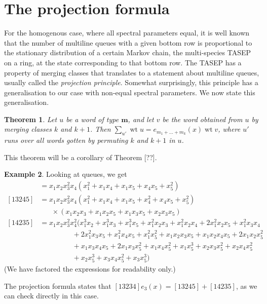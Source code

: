 \documentclass[reqno]{amsart}
\newcommand{\0}{\phantom{c}}
\DeclareMathOperator{\wt}{wt} %
\newcommand{\mm}{\mathbf{m}}
\let\sumnonlimits\sum
\renewcommand{\sum}{\sumnonlimits\limits}
\theoremstyle{plain}
\newtheorem{thm}{Theorem}[section]
\theoremstyle{definition}
\newtheorem{example}[thm]{Example}
\numberwithin{equation}{section}
\begin{document}
\section{The projection formula}

For the homogenous case, where all spectral parameters equal, it is well known that the number of multiline queues with a given bottom row is proportional to the stationary distribution of a certain Markov chain, the multi-species TASEP on a ring, at the state corresponding to that bottom row. The TASEP has a property of merging classes that translates to a statement about multiline queues, usually called the {\it projection principle}. Somewhat surprisingly, this principle has a generalisation to our case with non-equal spectral parameters. We now state this generalisation.

\begin{thm}
  Let $u$ be a word of type $\mm$, and let $v$ be the word obtained from $u$ by merging classes $k$ and $k+1$.
  Then $\sum_{u'} \wt{u} = e_{m_1+\dots+m_k}(x) \wt{v}$,
  where $u'$ runs over all words gotten by permuting $k$ and $k+1$ in $u$.
\end{thm}

This theorem will be a corollary of Theorem [??].


\begin{example}
Looking at queues, we get
\begin{align*}
[13234] & = x_1 x_2 x_3^2 x_4 (x_1^2 + x_1 x_4 + x_1 x_5 + x_4 x_5 + x_5^2)
\\ [13245] & = x_1 x_2 x_3^2 x_4 (x_1^2 + x_1x_4 + x_1x_5 + x_4^2 + x_4x_5 + x_5^2)
\\ & \hspace{20pt} \times (x_1x_2x_3 + x_1x_2x_5+x_1x_3x_5+x_2x_3x_5)
\\ [14235] & = x_1x_2x_3^2x_4^2 (x_1^3x_2 + x_1^3x_3 + x_1^3x_5 + x_1^2x_2x_3 + x_1^2x_2x_4 + 2x_1^2x_2x_5 + x_1^2x_3x_4
\\ & \hspace{55pt} + 2x_1^2x_3x_5 + x_1^2x_4x_5 + x_1^2x_5^2 + x_1x_2x_3x_5 + x_1x_2x_4x_5 + 2x_1x_2x_5^2
\\ & \hspace{55pt} + x_1x_3x_4x_5 + 2x_1x_3x_5^2 + x_1x_4x_5^2 + x_1x_5^3 + x_2x_3x_5^2 + x_2x_4x_5^2
\\ & \hspace{55pt} + x_2x_5^3 + x_3x_4x_5^2 + x_3x_5^3)
\end{align*}
(We have factored the expressions for readability only.)

The projection formula states that $[13234] e_3(x) = [13245] + [14235]$, as we can check directly in this case.
\end{example}
\end{document}
